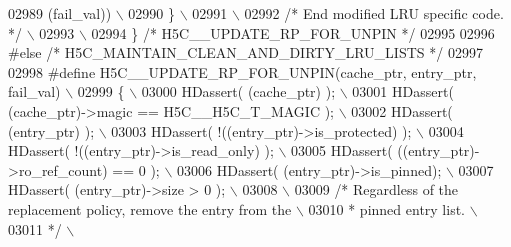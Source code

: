 \begin{DoxyCode}
02989 \textcolor{preprocessor}{                              (fail\_val))                              \(\backslash\)}
02990 \textcolor{preprocessor}{     \}                                                                 \(\backslash\)}
02991 \textcolor{preprocessor}{                                                                       \(\backslash\)}
02992 \textcolor{preprocessor}{    }\textcolor{comment}{/* End modified LRU specific code. */}\textcolor{preprocessor}{                              \(\backslash\)}
02993 \textcolor{preprocessor}{                                                                       \(\backslash\)}
02994 \textcolor{preprocessor}{\} }\textcolor{comment}{/* H5C\_\_UPDATE\_RP\_FOR\_UNPIN */}\textcolor{preprocessor}{}
02995 
02996 \textcolor{preprocessor}{#else }\textcolor{comment}{/* H5C\_MAINTAIN\_CLEAN\_AND\_DIRTY\_LRU\_LISTS */}\textcolor{preprocessor}{}
02997 
02998 \textcolor{preprocessor}{#define H5C\_\_UPDATE\_RP\_FOR\_UNPIN(cache\_ptr, entry\_ptr, fail\_val)       \(\backslash\)}
02999 \textcolor{preprocessor}{\{                                                                      \(\backslash\)}
03000 \textcolor{preprocessor}{    HDassert( (cache\_ptr) );                                           \(\backslash\)}
03001 \textcolor{preprocessor}{    HDassert( (cache\_ptr)->magic == H5C\_\_H5C\_T\_MAGIC );                \(\backslash\)}
03002 \textcolor{preprocessor}{    HDassert( (entry\_ptr) );                                           \(\backslash\)}
03003 \textcolor{preprocessor}{    HDassert( !((entry\_ptr)->is\_protected) );                          \(\backslash\)}
03004 \textcolor{preprocessor}{    HDassert( !((entry\_ptr)->is\_read\_only) );                          \(\backslash\)}
03005 \textcolor{preprocessor}{    HDassert( ((entry\_ptr)->ro\_ref\_count) == 0 );                      \(\backslash\)}
03006 \textcolor{preprocessor}{    HDassert( (entry\_ptr)->is\_pinned);                                 \(\backslash\)}
03007 \textcolor{preprocessor}{    HDassert( (entry\_ptr)->size > 0 );                                 \(\backslash\)}
03008 \textcolor{preprocessor}{                                                                       \(\backslash\)}
03009 \textcolor{preprocessor}{    }\textcolor{comment}{/* Regardless of the replacement policy, remove the entry from the \(\backslash\)}
03010 \textcolor{comment}{     * pinned entry list.                                              \(\backslash\)}
03011 \textcolor{comment}{     */}\textcolor{preprocessor}{                                                                \(\backslash\)}

\end{DoxyCode}
